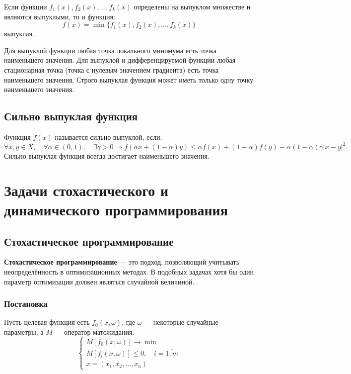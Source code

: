 \documentclass[17pt]{extarticle}
\begin{document}
Если функции \( f_1(x), f_2(x), \dots, f_k(x) \) определены на выпуклом множестве и являются выпуклыми, то и функция:
\[
    f(x) = \min\{ f_1(x), f_2(x), \dots, f_k(x) \}
\]
выпуклая.

Для выпуклой функции любая точка локального минимума есть точка наименьшего значения. Для выпуклой и дифференцируемой функции любая стационарная точка (точка с нулевым значением градиента) есть точка наименьшего значения. Строго выпуклая функция может иметь только одну точку наименьшего значения.

\subsection{Сильно выпуклая функция}
Функция \( f(x) \) называется сильно выпуклой, если:
\[
    \forall x, y \in X, \quad \forall \alpha \in (0,1), \quad \exists \gamma > 0 \Rightarrow
    f(\alpha x + (1 - \alpha) y) \le \alpha f(x) + (1 - \alpha) f(y) - \alpha(1-\alpha)\gamma|x-y|^2.
\]
Сильно выпуклая функция всегда достигает наименьшего значения.




\section{Задачи стохастического и динамического программирования}

\subsection{Стохастическое программирование}

\textbf{Стохастическое программирование} — это подход, позволяющий учитывать неопределённость в оптимизационных методах. В подобных задачах хотя бы один параметр оптимизации должен являться случайной величиной.

\subsubsection{Постановка}
Пусть целевая функция есть \( f_0(x, \omega) \), где \( \omega \) — некоторые случайные параметры, а \( M \) — оператор матожидания.
\[
    \begin{cases}
        M[f_0(x, \omega)] \to \min                        \\
        M[f_i(x, \omega)] \le 0, \quad i = \overline{1,m} \\
        x = (x_1, x_2, \dots, x_n)
    \end{cases}
\]
\end{document}

